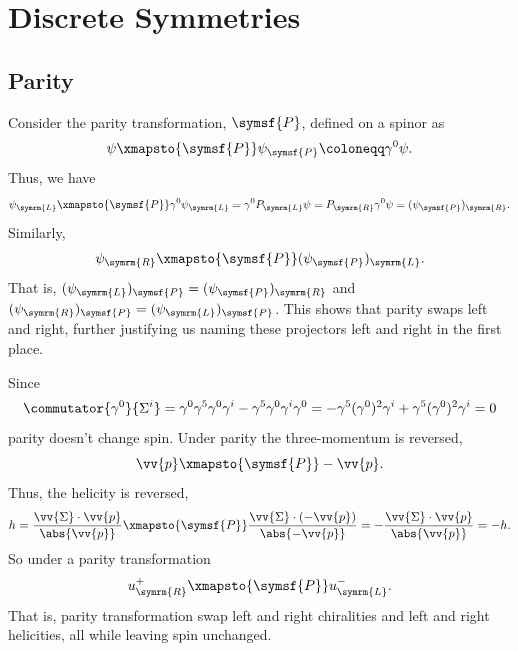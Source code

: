 \documentclass[fleqn]{NotesClass}
\newcommand{\parity}{\symsf{P}}
\newcommand{\Left}{\symrm{L}}
\newcommand{\Right}{\symrm{R}}
\begin{document}
    \section{Discrete Symmetries}
    \subsection{Parity}
    Consider the parity transformation, \(\parity\), defined on a spinor as
    \begin{equation}
        \psi \xmapsto{\parity} \psi_{\parity} \coloneqq \gamma^0\psi.
    \end{equation}
    Thus, we have
    \begin{equation}
        \psi_{\Left} \xmapsto{\parity} \gamma^0\psi_{\Left} = \gamma^0 P_{\Left} \psi = P_{\Right} \gamma^0 \psi = (\psi_{\parity})_{\Right}.
    \end{equation}
    Similarly,
    \begin{equation}
        \psi_{\Right} \xmapsto{\parity} (\psi_{\parity})_{\Left}.
    \end{equation}
    That is, \((\psi_{\Left})_{\parity} = (\psi_{\parity})_{\Right}\) and \((\psi_{\Right})_{\parity} = (\psi_{\Left})_{\parity}\).
    This shows that parity swaps left and right, further justifying us naming these projectors left and right in the first place.
    
    Since
    \begin{equation}
        \commutator{\gamma^0}{\Sigma^i} = \gamma^0\gamma^5\gamma^0\gamma^i - \gamma^5\gamma^0\gamma^i\gamma^0 = -\gamma^5(\gamma^0)^2\gamma^i + \gamma^5(\gamma^0)^2\gamma^i = 0
    \end{equation}
    parity doesn't change spin.
    Under parity the three-momentum is reversed,
    \begin{equation}
        \vv{p} \xmapsto{\parity} -\vv{p}.
    \end{equation}
    Thus, the helicity is reversed,
    \begin{equation}
        h = \frac{\vv{\Sigma} \cdot \vv{p}}{\abs{\vv{p}}} \xmapsto{\parity} \frac{\vv{\Sigma} \cdot (-\vv{p})}{\abs{-\vv{p}}} = -\frac{\vv{\Sigma} \cdot \vv{p}}{\abs{\vv{p}}} = -h.
    \end{equation}
    So under a parity transformation
    \begin{equation}
        u^+_{\Right} \xmapsto{\parity} u^-_{\Left}.
    \end{equation}
    That is, parity transformation swap left and right chiralities and left and right helicities, all while leaving spin unchanged.
\end{document}
